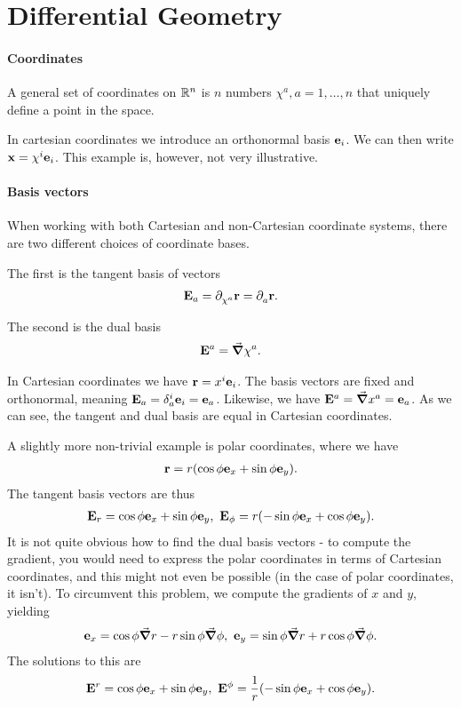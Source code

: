 \section{Differential Geometry}

\paragraph{Coordinates}
A general set of coordinates on $\mathbb{R}^{n}$ is $n$ numbers $\chi^{a}, a = 1, \dots, n$ that uniquely define a point in the space.

In cartesian coordinates we introduce an orthonormal basis $\vb{e}_{i}$. We can then write $\vb{x} = \chi^{i}\vb{e}_{i}$. This example is, however, not very illustrative.

\paragraph{Basis vectors}
When working with both Cartesian and non-Cartesian coordinate systems, there are two different choices of coordinate bases.

The first is the tangent basis of vectors
\begin{align*}
	\vb{E}_{a} = \partial^{}_{\chi^{a}}\vb{r} = \partial^{}_{a}\vb{r}.
\end{align*}

The second is the dual basis
\begin{align*}
	\vb{E}^{a} = \grad{\chi^{a}}.
\end{align*}

In Cartesian coordinates we have $\vb{r} = x^{i}\vb{e}_{i}$. The basis vectors are fixed and orthonormal, meaning $\vb{E}_{a} = \delta_{a}^{i}\vb{e}_{i} = \vb{e}_{a}$. Likewise, we have $\vb{E}^{a} = \grad{x^{a}} = \vb{e}_{a}$. As we can see, the tangent and dual basis are equal in Cartesian coordinates.

A slightly more non-trivial example is polar coordinates, where we have
\begin{align*}
	\vb{r} = r(\cos{\phi}\vb{e}_{x} + \sin{\phi}\vb{e}_{y}).
\end{align*}
The tangent basis vectors are thus
\begin{align*}
	\vb{E}_{r} = \cos{\phi}\vb{e}_{x} + \sin{\phi}\vb{e}_{y},\ \vb{E}_{\phi} = r(-\sin{\phi}\vb{e}_{x} + \cos{\phi}\vb{e}_{y}).
\end{align*}
It is not quite obvious how to find the dual basis vectors - to compute the gradient, you would need to express the polar coordinates in terms of Cartesian coordinates, and this might not even be possible (in the case of polar coordinates, it isn't). To circumvent this problem, we compute the gradients of $x$ and $y$, yielding
\begin{align*}
	\vb{e}_{x} = \cos{\phi}\grad{r} - r\sin{\phi}\grad{\phi},\ \vb{e}_{y} = \sin{\phi}\grad{r} + r\cos{\phi}\grad{\phi}.
\end{align*}
The solutions to this are
\begin{align*}
	\vb{E}^{r} = \cos{\phi}\vb{e}_{x} + \sin{\phi}\vb{e}_{y},\ \vb{E}^{\phi} = \frac{1}{r}(-\sin{\phi}\vb{e}_{x} + \cos{\phi}\vb{e}_{y}).
\end{align*}

